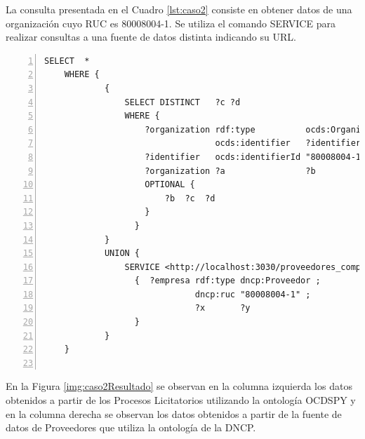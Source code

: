 La consulta presentada en el Cuadro \ref{lst:caso2} consiste en obtener datos de una organización cuyo RUC es 80008004-1. Se utiliza el comando SERVICE para realizar consultas a una fuente de datos distinta indicando su URL.

\noindent\begin{minipage}[c]{\textwidth}
\begin{lstlisting}[captionpos=b, caption={Consulta a dos fuentes de de datos}, label={lst:caso2},  numbers=left,  numberstyle=\tiny\color{mygray},frame=single]
SELECT  *
    WHERE {   
            { 
                SELECT DISTINCT   ?c ?d
                WHERE { 
                    ?organization rdf:type          ocds:Organization ;
                                  ocds:identifier   ?identifier .
                    ?identifier   ocds:identifierId "80008004-1" .
                    ?organization ?a                ?b
                    OPTIONAL { 
                        ?b  ?c  ?d 
                    }
                  }
            }
            UNION {
                SERVICE <http://localhost:3030/proveedores_completas_no_inf/sparql>
                  {  ?empresa rdf:type dncp:Proveedor ;
                              dncp:ruc "80008004-1" ;
                              ?x       ?y
                  }
            }
    }
    
 \end{lstlisting}
\end{minipage}

 En la Figura \ref{img:caso2Resultado} se observan en la columna izquierda los datos obtenidos a partir de los Procesos Licitatorios utilizando la ontología OCDSPY y en la columna derecha se observan los datos obtenidos a partir de la fuente de datos de Proveedores que utiliza la ontología de la DNCP.


